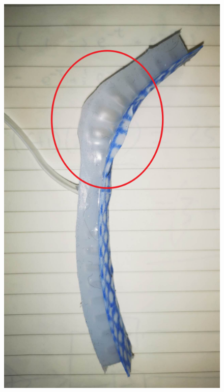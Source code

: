 \documentclass[conference]{IEEEtran}
\begin{document}
\begin{figure}[htbp]
\centering
\begin{minipage}[t]{0.48\linewidth}
\centering
\includegraphics[width=0.8\linewidth]{pics/Section3/uneven.png}
\label{fig:uneven}
\end{minipage}
\begin{minipage}[t]{0.48\linewidth}
\centering

\end{minipage}
\end{figure}
\end{document}
